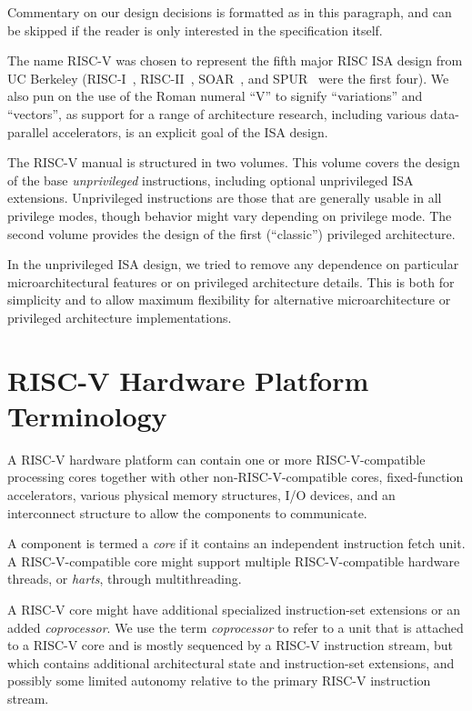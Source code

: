 \begin{commentary}
Commentary on our design decisions is formatted as in this paragraph,
and can be skipped if the reader is only interested in the
specification itself.
\end{commentary}
\begin{commentary}
The name RISC-V was chosen to represent the fifth major RISC ISA
design from UC Berkeley (RISC-I~\cite{riscI-isca1981},
RISC-II~\cite{Katevenis:1983}, SOAR~\cite{Ungar:1984}, and
SPUR~\cite{spur-jsscc1989} were the first four).  We also pun on the
use of the Roman numeral ``V'' to signify ``variations'' and
``vectors'', as support for a range of architecture research,
including various data-parallel accelerators, is an explicit goal of
the ISA design.
\end{commentary}

The RISC-V manual is structured in two volumes.  This volume covers
the design of the base {\em unprivileged} instructions, including
optional unprivileged ISA extensions.  Unprivileged instructions are
those that are generally usable in all privilege modes, though
behavior might vary depending on privilege mode.  The second volume
provides the design of the first (``classic'') privileged
architecture.

\begin{commentary}
In the unprivileged ISA design, we tried to remove any dependence on
particular microarchitectural features or on privileged architecture
details.  This is both for simplicity and to allow maximum flexibility
for alternative microarchitecture or privileged architecture
implementations.
\end{commentary}

\section{RISC-V Hardware Platform Terminology}

A RISC-V hardware platform can contain one or more RISC-V-compatible
processing cores together with other non-RISC-V-compatible cores,
fixed-function accelerators, various physical memory structures, I/O
devices, and an interconnect structure to allow the components to
communicate.

A component is termed a {\em core} if it contains an independent
instruction fetch unit.  A RISC-V-compatible core might support
multiple RISC-V-compatible hardware threads, or {\em harts}, through
multithreading.

A RISC-V core might have additional specialized instruction-set
extensions or an added {\em coprocessor}.  We use the term {\em
  coprocessor} to refer to a unit that is attached to a RISC-V core
and is mostly sequenced by a RISC-V instruction stream, but which
contains additional architectural state and instruction-set
extensions, and possibly some limited autonomy relative to the
primary RISC-V instruction stream.

